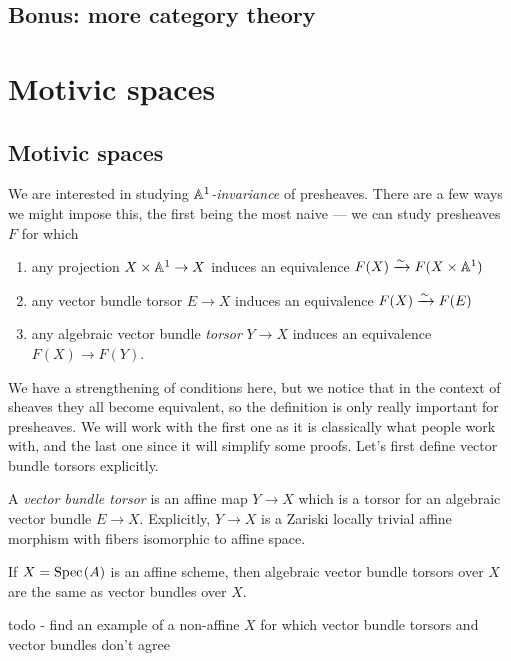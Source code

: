 \documentclass[11pt,openany]{book}
\begin{document}
\section{Bonus: more category theory}




\chapter{Motivic spaces}
\minitoc
\section{Motivic spaces}

We are interested in studying \textit{$\mathbb{A}^1$-invariance} of presheaves. There are a few ways we might impose this, the first being the most naive --- we can study presheaves $F$ for which
\begin{enumerate}
    \item any projection $X \times \mathbb{A}^1 \to X$ induces an equivalence $F(X) \xrightarrow{\sim} F(X \times \mathbb{A}^1)$
    \item any  vector bundle torsor $E \to X$ induces an equivalence $F(X) \xrightarrow{\sim} F(E)$
    \item any algebraic vector bundle \textit{torsor} $Y \to X$ induces an equivalence $F(X) \to F(Y)$.
\end{enumerate}
We have a strengthening of conditions here, but we notice that in the context of sheaves they all become equivalent, so the definition is only really important for presheaves. We will work with the first one as it is classically what people work with, and the last one since it will simplify some proofs. Let's first define vector bundle torsors explicitly.

\begin{definition} \cite[4.2]{Weibel-KH}
A \textit{vector bundle torsor} is an affine map $Y \to X$ which is a torsor for an algebraic vector bundle $E \to X$. Explicitly, $Y \to X$ is a Zariski locally trivial affine morphism with fibers isomorphic to affine space.
\end{definition}

\begin{example} If $X = \text{Spec}\hspace{0.1em}(A)$ is an affine scheme, then algebraic vector bundle torsors over $X$ are the same as vector bundles over $X$.
\end{example}

todo - find an example of a non-affine $X$ for which vector bundle torsors and vector bundles don't agree
\end{document}
